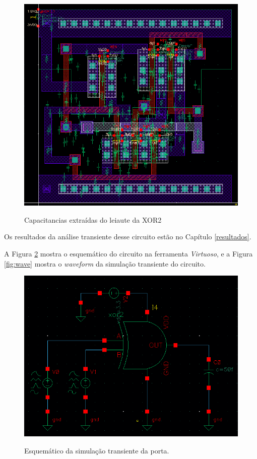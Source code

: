 \documentclass{iiufrgs}
\newcommand{\virtuoso}{\textit{Virtuoso}}
\begin{document}
\begin{figure}[htbp]
    \centering
    \caption{Capacitancias extraídas do leiaute da XOR2}
    \includegraphics[scale=0.65]{images/cap.png}
    \label{fig:capacitancias}
\end{figure}

\FloatBarrier

Os resultados da análise transiente desse circuito estão no Capítulo \ref{resultados}.\

A Figura \ref{fig:trans} mostra o esquemático do circuito na ferramenta \virtuoso, e a Figura \ref{fig:wave} mostra o \textit{waveform} da simulação transiente do circuito.\

\begin{figure}[htbp]
    \centering
    \caption{Esquemático da simulação transiente da porta.}
    \includegraphics[scale=0.45]{images/trans.png}
    \label{fig:trans}
\end{figure}
\end{document}
